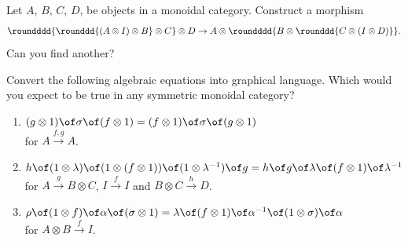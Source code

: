 \def\pathToRoot{../../}

\graphicspath{{graphics/}}



\author{Felix Rech}


\begin{exercise}
  Let $A$, $B$, $C$, $D$, be objects in a monoidal category.
  Construct a morphism
  \[
    \roundddd{\rounddd{(A \otimes I) \otimes B} \otimes C} \otimes D
    \to A \otimes \roundddd{B \otimes \rounddd{C \otimes (I \otimes D)}}.
  \]
  Can you find another?
\end{exercise}


\begin{exercise}
  Convert the following algebraic equations into graphical language.
  Which would you expect to be true in any symmetric monoidal category?
  \begin{enumerate}
    \item
      $(g \otimes 1) \of \sigma \of (f \otimes 1)
        = (f \otimes 1) \of \sigma \of (g \otimes 1)$ \\
      for $A \xrightarrow{f, g} A$.

    \item
      $h \of (1 \otimes \lambda) \of (1 \otimes (f \otimes 1)) \of (1 \otimes \lambda^{-1}) \of g
        = h \of g \of \lambda \of (f \otimes 1) \of \lambda^{-1}$ \\
      for $A \xrightarrow{g} B \otimes C$, $I \xrightarrow{f} I$ and $B \otimes C \xrightarrow{h} D$.

    \item
      $\rho \of (1 \otimes f) \of \alpha \of (\sigma \otimes 1)
        = \lambda \of (f \otimes 1) \of \alpha^{-1} \of (1 \otimes \sigma) \of \alpha$ \\
      for $A \otimes B \xrightarrow{f} I$.
  \end{enumerate}
\end{exercise}


